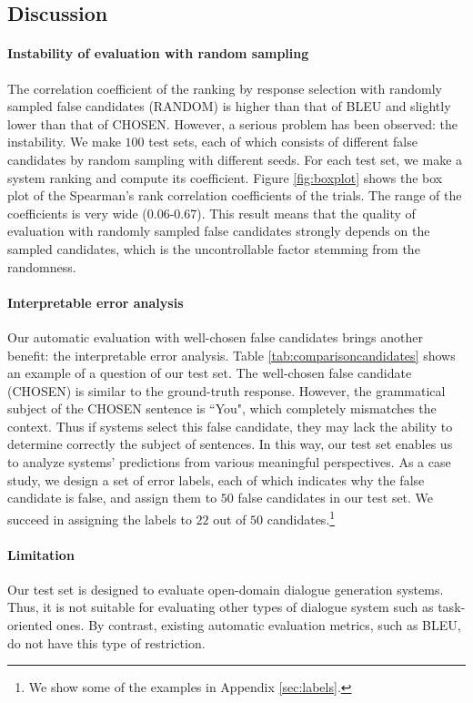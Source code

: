 \documentclass[11pt,a4paper]{article}
\begin{document}
\subsection{Discussion} \label{subsec:Discussion}
\paragraph{Instability of evaluation with random sampling}
The correlation coefficient of the ranking by response selection with randomly sampled false candidates (RANDOM) is higher than that of BLEU and slightly lower than that of CHOSEN.
However, a serious problem has been observed: the instability.
We make $100$ test sets, each of which consists of different false candidates by random sampling with different seeds.
For each test set, we make a system ranking and compute its coefficient.
Figure \ref{fig:boxplot} shows the box plot of the Spearman's rank correlation coefficients of the trials.
The range of the coefficients is very wide (0.06-0.67).
This result means that the quality of evaluation with randomly sampled false candidates strongly depends on the sampled candidates, which is the uncontrollable factor stemming from the randomness.

\paragraph{Interpretable error analysis}
Our automatic evaluation with well-chosen false candidates brings another benefit: the interpretable error analysis.
Table \ref{tab:comparisoncandidates} shows an example of a question of our test set.
The well-chosen false candidate (CHOSEN) is similar to the ground-truth response.
However, the grammatical subject of the CHOSEN sentence is ``You", which completely mismatches the context.
Thus if systems select this false candidate, they may lack the ability to determine correctly the subject of sentences.
In this way, our test set enables us to analyze systems' predictions from various meaningful perspectives.
As a case study, we design a set of error labels, each of which indicates why the false candidate is false, and assign them to $50$ false candidates in our test set.
We succeed in assigning the labels to $22$ out of $50$ candidates.\footnote{We show some of the examples in Appendix \ref{sec:labels}.}

\paragraph{Limitation}
Our test set is designed to evaluate open-domain dialogue generation systems.
Thus, it is not suitable for evaluating other types of dialogue system such as task-oriented ones.
By contrast, existing automatic evaluation metrics, such as BLEU, do not have this type of restriction. 
\end{document}
